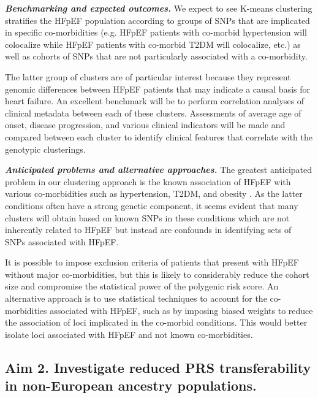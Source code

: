 \documentclass[11pt]{article}  %
\newlength\tindent
\renewcommand{\indent}{\hspace*{\tindent}}
\begin{document}
\indent \textbf{\textit{Benchmarking and expected outcomes.}} We expect to see K-means clustering stratifies the HFpEF population according to groups of SNPs that are implicated in specific co-morbidities (e.g. HFpEF patients with co-morbid hypertension will colocalize while HFpEF patients with co-morbid T2DM will colocalize, etc.) as well as cohorts of SNPs that are not particularly associated with a co-morbidity.

\hspace{10mm} The latter group of clusters are of particular interest because they represent genomic differences between HFpEF patients that may indicate a causal basis for heart failure. An excellent benchmark will be to perform correlation analyses of clinical metadata between each of these clusters. Assessments of average age of onset, disease progression, and various clinical indicators will be made and compared between each cluster to identify clinical features that correlate with the genotypic clusterings.



\indent \textbf{\textit{Anticipated problems and alternative approaches.}}
The greatest anticipated problem in our clustering approach is the known association of HFpEF with various co-morbidities such as hypertension, T2DM, and obesity \cite{ergatoudes_non-cardiac_2019}. As the latter conditions often have a strong genetic component, it seems evident that many clusters will obtain based on known SNPs in these conditions which are not inherently related to HFpEF but instead are confounds in identifying sets of SNPs associated with HFpEF. 

\hspace{10mm} It is possible to impose exclusion criteria of patients that present with HFpEF without major co-morbidities, but this is likely to considerably reduce the cohort size and compromise the statistical power of the polygenic risk score. An alternative approach is to use statistical techniques to account for the co-morbidities associated with HFpEF, such as by imposing biased weights to reduce the association of loci implicated in the co-morbid conditions. This would better isolate loci associated with HFpEF and not known co-morbidities.


\subsection*{Aim 2. Investigate reduced PRS transferability in non-European ancestry populations.}
\end{document}
